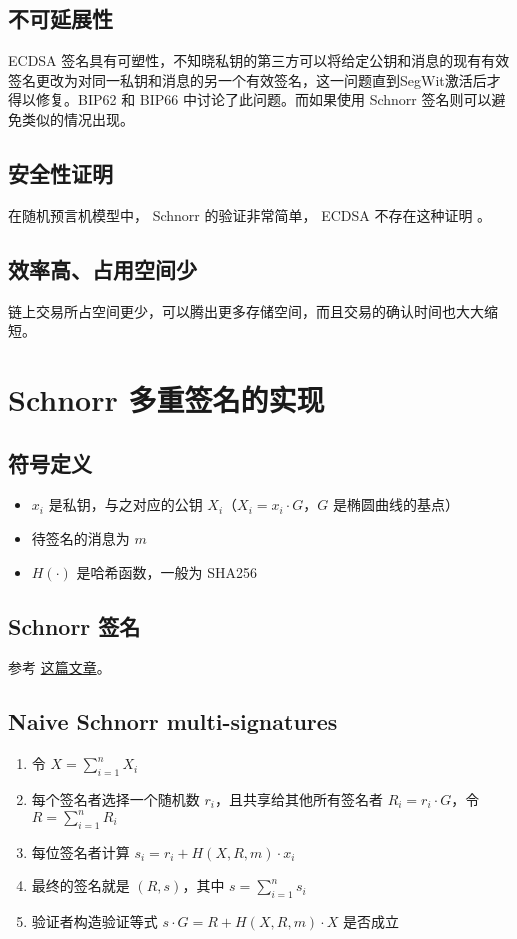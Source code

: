\documentclass[a4paper,10pt]{article}
\begin{document}
\subsection{不可延展性}

 ECDSA 签名具有可塑性，不知晓私钥的第三方可以将给定公钥和消息的现有有效签名更改为对同一私钥和消息的另一个有效签名，这一问题直到SegWit激活后才得以修复。BIP62 \cite{bip62} 和 BIP66 \cite{bip66}中讨论了此问题。而如果使用 Schnorr 签名则可以避免类似的情况出现。

\subsection{安全性证明}

在随机预言机模型中， Schnorr 的验证非常简单， ECDSA 不存在这种证明 \cite{seurin2012exact}。

\subsection{效率高、占用空间少}

链上交易所占空间更少，可以腾出更多存储空间，而且交易的确认时间也大大缩短。

\section{Schnorr 多重签名的实现}
\subsection{符号定义}
\begin{itemize}
  \item \(x_i\) 是私钥，与之对应的公钥 \(X_i\)（\(X_i=x_i\cdot G\)，\(G\) 是椭圆曲线的基点）
  \item 待签名的消息为 \(m\)
  \item \(H(\cdot)\) 是哈希函数，一般为 SHA256
\end{itemize}

\subsection{Schnorr 签名}

参考 \href{https://mp.weixin.qq.com/s/SlbgZ0XbgYIN-DtmDyP7Lg}{这篇文章}。

\subsection{Naive Schnorr multi-signatures}
\begin{enumerate}
  \item 令 \(X=\sum_{i=1}^n X_i\)
  \item 每个签名者选择一个随机数 \(r_i\)，且共享给其他所有签名者 \(R_i=r_i\cdot G\)，令 \(R=\sum_{i=1}^n R_i\)
  \item 每位签名者计算 \(s_i=r_i+H(X,R,m)\cdot x_i\)
  \item 最终的签名就是 \((R,s)\)，其中 \(s=\sum_{i=1}^n s_i\)
  \item 验证者构造验证等式 \(s\cdot G=R+H(X,R,m)\cdot X\) 是否成立
\end{enumerate}
\end{document}
